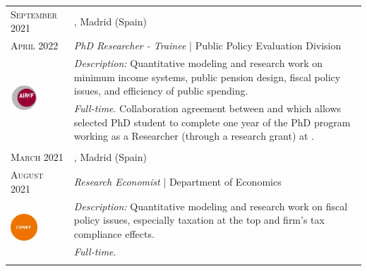 \begin{longtable}{R{2.5cm}|p{14.8cm}}
 	\textsc{September 2021} & \textsc{}, \faMapMarker \hspace{0.5 mm} Madrid (Spain) \\
 	\textsc{April 2022} 	& \textit{PhD Researcher - Trainee} | Public Policy Evaluation Division\\
	 & 
	\footnotesize{\faTasks \emph{ Description: }Quantitative modeling and research work on minimum income systems, public pension design, fiscal policy issues, and efficiency of public spending.} \\ &
	\footnotesize{\faFileText \emph{ Full-time}. Collaboration agreement between  \hspace{0.5 mm} and  which allows selected PhD student to complete one year of the PhD program working as a Researcher (through a research grant) at .}\\
 	 \\
 
 	 	\textsc{March 2021} & \textsc{}, \faMapMarker \hspace{0.5 mm} Madrid (Spain) \\
 	\textsc{August 2021} 	& \textit{Research Economist} | Department of Economics \\
	 & 
 	\footnotesize{\faTasks \emph{ Description: }Quantitative modeling and research work on fiscal policy issues, especially taxation at the top and firm’s tax compliance effects.} \\ &
	\footnotesize{\faFileText \emph{ Full-time}}. \\
 	 \\
	

\end{longtable}
